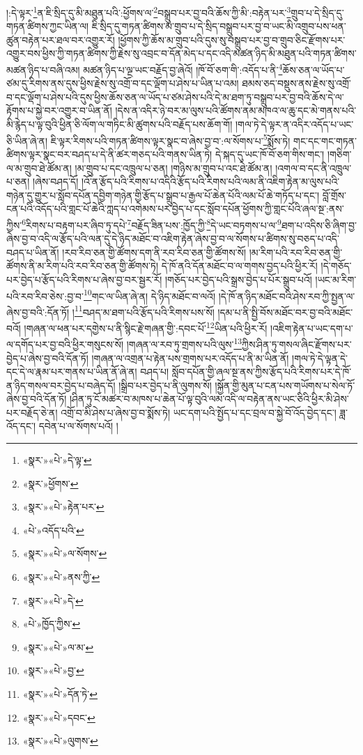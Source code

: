 །:དེ་ལྟར་\footnote{«སྣར་»«པེ་»དེ་ལྟ་}ན་ཇི་སྲིད་དུ་མི་མཐུན་པའི་:ཕྱོགས་ལ་\footnote{«སྣར་»ཕྱོགས་}བསྒྲུབ་པར་བྱ་བའི་ཆོས་ཀྱི་མི་:བརྟེན་པར་\footnote{«སྣར་»«པེ་»རྟེན་པར་}གྲུབ་པ་དེ་སྲིད་དུ་གཏན་ཚིགས་ཀྱང་ཡིན་ལ། ཇི་སྲིད་དུ་གཏན་ཚིགས་མ་གྲུབ་པ་དེ་སྲིད་བསྒྲུབ་པར་བྱ་བ་ཡང་མི་འགྲུབ་པས་ཕན་ཚུན་བརྟེན་པར་ཐལ་བར་འགྱུར་རོ། །ཕྱོགས་ཀྱི་ཆོས་མ་གྲུབ་པའི་དུས་སུ་བསྒྲུབ་པར་བྱ་བ་གྲུབ་ཅིང་རྫོགས་པར་འགྱུར་བས་ཕྱིས་ཀྱི་གཏན་ཚིགས་ཀྱི་རྗེས་སུ་འབྲང་བ་དོན་མེད་པ་དང་འདི་མཚན་ཉིད་མི་མཐུན་པའི་གཏན་ཚིགས་མཚན་ཉིད་པ་བཞི་འམ། མཚན་ཉིད་པ་ལྔ་ཡང་བརྗོད་བྱ་ཞེའོ། །ཁོ་བོ་ཅག་གི་:འདོད་པ་ནི་\footnote{«པེ་»འདོད་པའི་}ཆོས་ཅན་ལ་ཡོད་པ་ཙམ་དུ་རིགས་ནས་དུས་ཕྱིས་རྗེས་སུ་འགྲོ་བ་དང་ལྡོག་པ་ཤེས་པ་ཡིན་པ་འམ། ཐམས་ཅད་བསྡུས་ནས་རྗེས་སུ་འགྲོ་བ་དང་ལྡོག་པ་ཤེས་པའི་དུས་ཕྱིས་ཆོས་ཅན་ལ་ཡོད་པ་ཙམ་ཤེས་པའི་དེ་མ་ཐག་ཏུ་བསྒྲུབ་པར་བྱ་བའི་ཆོས་དེ་ལ་རྟོགས་པ་སྐྱེ་བར་འགྱུར་བ་ཡིན་ནོ། །དེས་ན་འདིར་ཉེ་བར་མ་ལུས་པའི་ཚོགས་ནམ་མཁའ་ལ་ཆུ་དང་མེ་གནས་པའི་མི་རྙེད་པ་ལྟ་བུའི་ཕྱིན་ཅི་ལོག་ལ་གཏིང་མི་ཚུགས་པའི་བརྗོད་པས་ཆོག་གོ། །གལ་ཏེ་དེ་ལྟར་ན་འདིར་འདོད་པ་ཡང་ཅི་ཡིན་ཞེ་ན། ཇི་ལྟར་རིགས་པའི་གཏན་ཚིགས་ལྟར་སྣང་བ་ཞེས་བྱ་བ་:ལ་སོགས་པ་\footnote{«སྣར་»«པེ་»ལ་སོགས་}སྨོས་ཏེ། གང་དང་གང་གཏན་ཚིགས་ལྟར་སྣང་བར་བཤད་པ་དེ་ནི་ཚར་གཅད་པའི་གནས་ཡིན་ཏེ། དེ་སྐད་དུ་ཡང་ཁོ་བོ་ཅག་གིས་གང་། །གཅིག་ལ་མ་གྲུབ་ཐེ་ཚོམ་ན། །མ་གྲུབ་པ་དང་འཁྲུལ་པ་ཅན། །གཉིས་མ་གྲུབ་པ་འང་ཐེ་ཚོམ་ན། །འགལ་བ་དང་ནི་འཁྲུལ་པ་ཅན། །ཞེས་བཤད་དོ། །འོ་ན་རྩོད་པའི་རིགས་པ་འདིའི་རྩོད་པའི་རིགས་པའི་ལམ་ནི་འཇིག་རྟེན་མ་ལུས་པའི་གཉེན་དུ་གྱུར་པ་སློབ་དཔོན་དབྱིག་གཉེན་གྱི་རྩོད་པ་སྒྲུབ་པ་རྒྱལ་པོ་ཆེན་པོའི་ལམ་པོ་ཆེ་གཏོད་པ་དང་། བློ་གྲོས་ངན་པའི་འདོད་པའི་གླང་པོ་ཆེའི་ཀླད་པ་འགེམས་པར་བྱེད་པ་དང་སློབ་དཔོན་ཕྱོགས་ཀྱི་གླང་པོའི་ཞལ་སྔ་:ནས་ཀྱིས་\footnote{«སྣར་»«པེ་»ནས་ཀྱི་}རིགས་པ་བརྟག་པར་ཞིབ་ཏུ་དཔེ་\footnote{«སྣར་»«པེ་»དེ་}བརྗོད་ཟིན་པས་:ཁྱོད་ཀྱི་\footnote{«པེ་»ཁྱོད་ཀྱིས་}དེ་ཡང་བཏགས་པ་ལ་\footnote{«སྣར་»«པེ་»ལ་མ་}ཐག་པ་འདིས་ཅི་ཞིག་བྱ་ཞེས་བྱ་བ་འདི་ལ་རྩོད་པའི་ལན་དུ་དེ་ཉིད་མཐོང་བ་འཇིག་རྟེན་ཞེས་བྱ་བ་ལ་སོགས་པ་ཚིགས་སུ་བཅད་པ་འདི་བཤད་པ་ཡིན་ནོ། །རབ་རིབ་ཅན་གྱི་ཚོགས་དག་ནི་རབ་རིབ་ཅན་གྱི་ཚོགས་སོ། །མ་རིག་པའི་རབ་རིབ་ཅན་གྱི་ཚོགས་ནི་མ་རིག་པའི་རབ་རིབ་ཅན་གྱི་ཚོགས་ཏེ། དེ་ཁོ་ནའི་དོན་མཐོང་བ་ལ་གགས་བྱད་པའི་ཕྱིར་རོ། །དེ་གཅོད་པར་བྱེད་པ་རྩོད་པའི་རིགས་པ་ཞེས་བྱ་བར་སྦྱར་རོ། །གཅོད་པར་བྱེད་པའི་སྒྲས་བྱེད་པ་པོར་སྒྲུབ་པའོ། །ཡང་མ་རིག་པའི་རབ་རིབ་ཅེས་:བྱ་བ་\footnote{«སྣར་»«པེ་»བྱ་}གང་ལ་ཡིན་ཞེ་ན། དེ་ཉིད་མཐོང་བ་ལའོ། །དེ་ཁོ་ན་ཉིད་མཐོང་བའི་ཤེས་རབ་ཀྱི་སྤྱན་ལ་ཞེས་བྱ་བའི་:དོན་ཏོ། །\footnote{«སྣར་»«པེ་»དོན་ཏེ་}བཤད་མ་ཐག་པའི་རྩོད་པའི་རིགས་པས་སོ། །དམ་པ་ནི་སྤྱི་བོས་མཐོང་བར་བྱ་བའི་མཐོང་བའོ། །གཞན་ལ་ཕན་པར་དགྱེས་པ་ནི་སྙིང་རྗེ་གཞན་གྱི་:དབང་པོ་\footnote{«སྣར་»«པེ་»དབང་}ཡིན་པའི་ཕྱིར་རོ། །འཇིག་རྟེན་པ་ཡང་དག་པ་ལ་དགོད་པར་བྱ་བའི་ཕྱིར་གསུངས་སོ། །གཞན་ལ་རབ་ཏུ་གྲགས་པའི་ལུས་\footnote{«སྣར་»«པེ་»ལུགས་}ཀྱིས་ཤིན་ཏུ་གསལ་ཞིང་རྫོགས་པར་བྱེད་པ་ཞེས་བྱ་བའི་དོན་ཏོ། །གཞན་ལ་འགྲན་པ་རྟེན་པས་གྲགས་པར་འདོད་པ་ནི་མ་ཡིན་ནོ། །གལ་ཏེ་དེ་ལྟན་དེ་དང་དེ་ལ་རྣམ་པར་གནས་པ་ཡིན་ནོ་ཞེ་ན། བཤད་པ། སློབ་དཔོན་གྱི་ཞལ་སྔ་ནས་ཀྱིས་རྩོད་པའི་རིགས་པར་དེ་ཁོ་ན་ཉིད་གསལ་བར་བྱེད་པ་བཞེད་དོ། །སྒྲིབ་པར་བྱེད་པ་ནི་ལུགས་སོ། །སྐྱོན་གྱི་མུན་པ་ངན་པས་གཡོགས་པ་སེལ་ཏོ་ཞེས་བྱ་བའི་དོན་ཏོ། །ཤིན་ཏུ་ངོ་མཚར་བ་མཁས་པ་ཆེན་པོ་ལྟ་བུའི་ལམ་འདི་ལ་བརྟེན་ནས་ཡང་ཅིའི་ཕྱིར་མི་ཤེས་པར་བརྗོད་ཅེ་ན། འགྲོ་བ་མི་ཤེས་པ་ཞེས་བྱ་བ་སྨོས་ཏེ། ཡང་དག་པའི་སྤྱོད་པ་དང་བྲལ་བ་སྐྱེ་བོ་འོད་བྱེད་དང་། ཟླ་འོད་དང་། དབེན་པ་ལ་སོགས་པའོ། །
